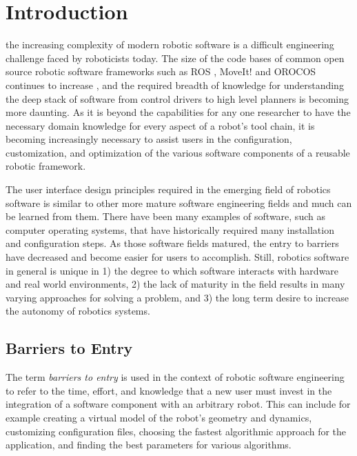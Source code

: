 \documentclass[10pt,journal,compsoc]{joser1}
\begin{document}
\section{Introduction}
 {the increasing complexity of modern robotic software is a difficult engineering challenge faced by roboticists today. The size of the code bases of common open source robotic software frameworks such as ROS \cite{quigley2009ros}, MoveIt! \cite{moveit} and OROCOS \cite{bruyninckx2001open} continues to increase \cite{makarenko2007benefits}, and the required breadth of knowledge for understanding the deep stack of software from control drivers to high level planners is becoming more daunting. As it is beyond the capabilities for any one researcher to have the necessary domain knowledge for every aspect of a robot's tool chain, it is becoming increasingly necessary to assist users in the configuration, customization, and optimization of the various software components of a reusable robotic framework. 

The user interface design principles required in the emerging field of robotics software is similar to other more mature software engineering fields and much can be learned from them. There have been many examples of software, such as computer operating systems, that have historically required many installation and configuration steps. As those software fields matured, the entry to barriers have decreased and become easier for users to accomplish. Still, robotics software in general is unique in 1) the degree to which software interacts with hardware and real world environments, 2) the lack of maturity in the field results in many varying approaches for solving a problem, and 3) the long term desire to increase the autonomy of robotics systems. 

\subsection{Barriers to Entry}

The term \textit{barriers to entry} is used in the context of robotic software engineering to refer to the time, effort, and knowledge that a new user must invest in the integration of a software component with an arbitrary robot. This can include for example creating a virtual model of the robot's geometry and dynamics, customizing configuration files, choosing the fastest algorithmic approach for the application, and finding the best parameters for various algorithms.

}
\end{document}
